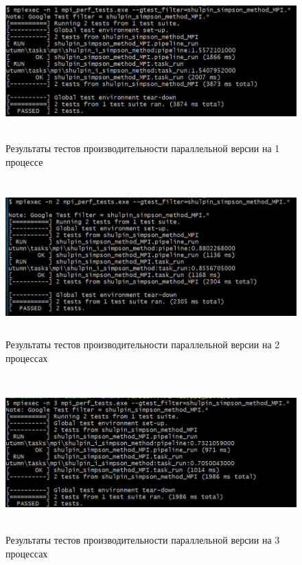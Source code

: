 \documentclass[12pt,a4paper]{article}
\begin{document}
\begin{figure}[H]
\centering
\includegraphics[height=6cm]{img/1nmpiperftest.jpg}
\caption{\label{fig:visualClass} Результаты тестов производительности параллельной версии на 1 процессе}
\end{figure}

\begin{figure}[H]
\centering
\includegraphics[height=6cm]{img/2nmpiperftest.jpg}
\caption{\label{fig:visualClass} Результаты тестов производительности параллельной версии на 2 процессах}
\end{figure}

\begin{figure}[H]
\centering
\includegraphics[height=6cm]{img/3nmpiperftest.jpg}
\caption{\label{fig:visualClass} Результаты тестов производительности параллельной версии на 3 процессах}
\end{figure}
\end{document}
